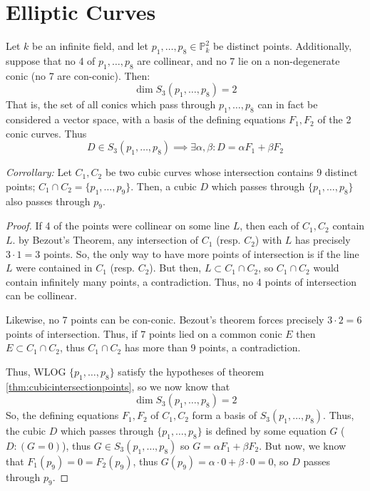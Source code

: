 \section{Elliptic Curves}

\begin{theorem}
\label{thm:cubicintersectionpoints}
Let $k$ be an infinite field, and let $p_1, \dots, p_8 \in \mathbb{P}^2_k$
be distinct points. Additionally, suppose that no 4 of $p_1, \dots, p_8$ are
collinear, and no 7 lie on a non-degenerate conic (no 7 are con-conic). Then:
\[
	\dim S_3(p_1, \dots, p_8) = 2
\]
That is, the set of all conics which pass through $p_1, \dots, p_8$ can in
fact be considered a vector space, with a basis of the defining equations $F_1, F_2$
of the 2 conic curves. Thus
\[
	D \in S_3(p_1, \dots, p_8) \implies \exists \alpha, \beta : D = \alpha F_1 + \beta F_2
\]
\end{theorem}

\begin{theorem}
\emph{Corrollary:}
Let $C_1, C_2$ be two cubic curves whose intersection contains 9 distinct points;
$C_1 \cap C_2 = \{p_1, \dots, p_9\}$. Then, a cubic $D$ which passes through 
$\{p_1, \dots, p_8\}$ also passes through $p_9$.
\end{theorem}

\begin{proof}
If 4 of the points were collinear on some line $L$, then each of $C_1,C_2$ contain $L$.
by Bezout's Theorem, any intersection of $C_1$ (resp. $C_2$) with $L$ has precisely $3 \cdot 1 = 3$
points. So, the only way to have more points of intersection is if the line $L$ were
contained in $C_1$ (resp. $C_2$).
But then, $L \subset C_1 \cap C_2$, so $C_1 \cap C_2$ would contain infinitely many points,
a contradiction. Thus, no 4 points of intersection can be collinear.

Likewise, no 7 points can be con-conic. Bezout's theorem forces precisely
$3 \cdot 2 = 6$ points of intersection. Thus, if 7 points lied on a common
conic $E$ then $E \subset C_1 \cap C_2$, thus $C_1 \cap C_2$ has more than
9 points, a contradiction.

Thus, WLOG $\{p_1, \dots, p_8\}$ satisfy the hypotheses of theorem \ref{thm:cubicintersectionpoints},
so we now know that 
\[
	\dim S_3(p_1, \dots, p_8) = 2
\]
So, the defining equations $F_1, F_2$ of $C_1, C_2$ form a basis of 
$S_3(p_1, \dots, p_8)$. Thus, the cubic $D$ which passes through
$\{p_1, \dots, p_8\}$ is defined by some equation $G$ ($D:(G=0)$),
thus $G \in S_3(p_1, \dots, p_8)$ so $G = \alpha F_1 + \beta F_2$.
But now, we know that $F_1(p_9) = 0 = F_2(p_9)$, thus
$G(p_9) = \alpha \cdot 0 + \beta \cdot 0 = 0$, so $D$ passes through $p_9$.
\end{proof}


